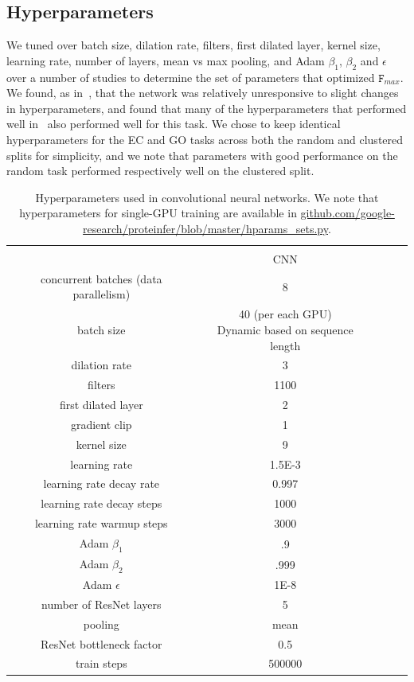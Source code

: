 \clearpage

\subsection{Hyperparameters}
We tuned over batch size, dilation rate, filters, first dilated layer, kernel size, learning rate, number of layers, mean vs max pooling, and Adam $\beta_1$, $\beta_2$ and $\epsilon$~\citep{kingma2014adam} over a number of studies to determine the set of parameters that optimized $\texttt{F}_{max}$. We found, as in~\cite{bileschi}, that the network was relatively unresponsive to slight changes in hyperparameters, and found that many of the hyperparameters that performed well in~\cite{bileschi} also performed well for this task. We chose to keep identical hyperparameters for the EC and GO tasks across both the random and clustered splits for simplicity, and we note that parameters with good performance on the random task performed respectively well on the clustered split. 
\begin{table}[htbp]
\centering
\def\arraystretch{1.1}
\begin{tabular}{|c|c|c|c|c|}
\hline
                           & \\
                           & CNN \\
\Xhline{1pt}
concurrent batches (data parallelism) & 8 \\
\hline
batch size                 & \shortstack{40 (per each GPU) \\ Dynamic based on sequence length} \\
\hline
dilation rate              & 3 \\
\hline
filters                    & 1100  \\
\hline
first dilated layer        & 2 \\
\hline
gradient clip              & 1 \\
\hline
kernel size                & 9 \\
\hline
learning rate              & 1.5E-3 \\
\hline
learning rate decay rate   & 0.997 \\
\hline
learning rate decay steps  & 1000 \\
\hline
learning rate warmup steps & 3000 \\
\hline
Adam $\beta_1$              & .9 \\
\hline
Adam $\beta_2$              & .999 \\
\hline
Adam $\epsilon$             & 1E-8 \\
\hline
number of ResNet layers     & 5 \\
\hline
pooling                     & mean \\
\hline
ResNet bottleneck factor    & 0.5 \\
\hline
train steps                 & 500000 \\
\hline
\end{tabular}
\caption{Hyperparameters used in convolutional neural networks. We note that hyperparameters for single-GPU training are available in \url{github.com/google-research/proteinfer/blob/master/hparams_sets.py}.}
\label{tab:nn_hparams}
\end{table} 
